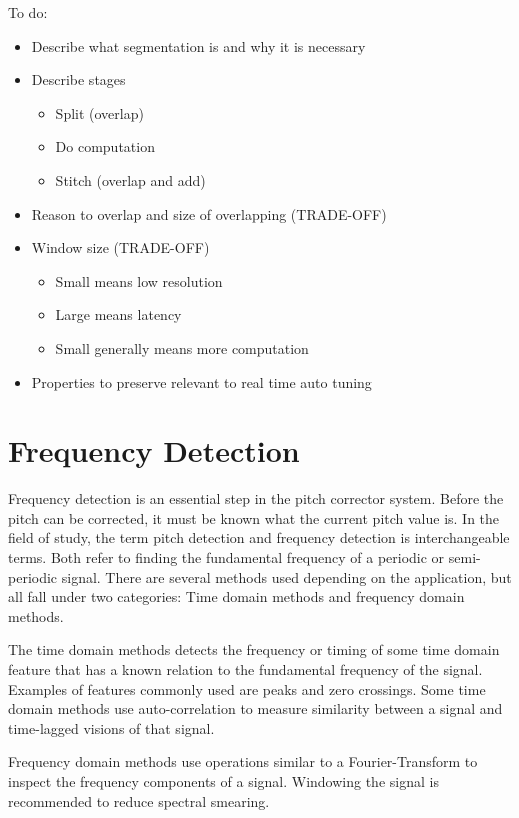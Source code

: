 \color{red}
To do:
\begin{itemize}
	\item Describe what segmentation is and why it is necessary
	\item Describe stages
	\begin{itemize}
		\item Split (overlap)
		\item Do computation
		\item Stitch (overlap and add)
	\end{itemize}
	\item Reason to overlap and size of overlapping (TRADE-OFF)
	\item Window size (TRADE-OFF)
	\begin{itemize}
		\item Small means low resolution
		\item Large means latency
		\item Small generally means more computation
	\end{itemize}
	\item Properties to preserve relevant to real time auto tuning
\end{itemize}
\color{black}

\section{Frequency Detection}

Frequency detection is an essential step in the pitch corrector system. Before the
pitch can be corrected, it must be known what the current pitch value is. In the
field of study, the term pitch detection and frequency detection is
interchangeable terms. Both refer to finding the fundamental frequency of a
periodic or semi-periodic signal\cite{ComparitivePitch}. There are several methods
used depending on the application, but all fall under two categories: Time domain
methods and frequency domain methods\cite{PDABook}.

The time domain methods detects the frequency or timing of some time domain
feature that has a known relation to the fundamental frequency of the signal.
Examples of features commonly used are peaks and zero crossings. Some time domain
methods use auto-correlation to measure similarity between a signal and
time-lagged visions of that signal\cite{PDABook}.

Frequency domain methods use operations similar to a Fourier-Transform to inspect
the frequency components of a signal. Windowing the signal is recommended to
reduce spectral smearing\cite{Windowing}.

